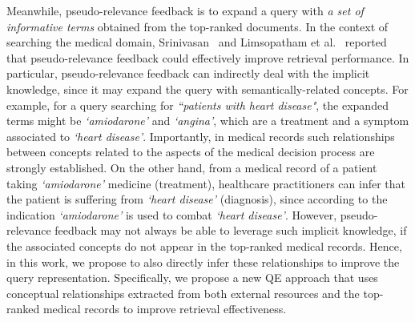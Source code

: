 \documentclass[1p]{elsarticle}
\begin{document}
Meanwhile, pseudo-relevance feedback is to expand a query with \emph{a set of informative terms} obtained from the top-ranked documents. In the context of searching the medical domain, Srinivasan~\cite{srinivasan1996ipmb} and Limsopatham et al.~\cite{limsopatham2012sigir} reported that pseudo-relevance feedback could effectively improve retrieval performance. In particular, pseudo-relevance feedback can indirectly deal with the implicit knowledge, since it may expand the query with semantically-related concepts. For example, for a query searching for \emph{``patients with heart disease"}, the expanded terms might be \emph{`amiodarone'} and \emph{`angina'}, which are a treatment and a symptom associated to \emph{`heart disease'}. Importantly, in medical records such relationships between concepts related to the aspects of the medical decision process are strongly established. On the other hand, from a medical record of a patient taking \emph{`amiodarone'} medicine (treatment), healthcare practitioners can infer that the patient is suffering from \emph{`heart disease'} (diagnosis), since according to the indication \emph{`amiodarone'} is used to combat \emph{`heart disease'}. However, pseudo-relevance feedback may not always be able to leverage such implicit knowledge, if the associated concepts do not appear in the top-ranked medical records. Hence, in this work, we propose to also directly infer these relationships to improve the query representation. Specifically, we propose a new QE approach that uses conceptual relationships extracted from both external resources and the top-ranked medical records to improve retrieval effectiveness.
\end{document}
